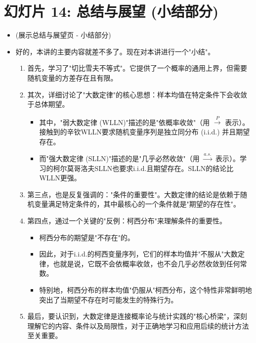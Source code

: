 \documentclass[UTF8]{article} %
\begin{document}
\section*{幻灯片 14: 总结与展望 (小结部分)}
\begin{itemize}
    \itemsep1em
    \item (展示总结与展望页 - 小结部分)
    \item 好的，本讲的主要内容就差不多了。现在对本讲进行一个"小结"。
    \begin{enumerate}[label=\arabic*., itemsep=0.5em]
        \item 首先，学习了"切比雪夫不等式"。它提供了一个概率的通用上界，但需要随机变量的方差存在且有限。
        \item 其次，详细讨论了"大数定律"的核心思想：样本均值在特定条件下会收敛于总体期望。
            \begin{itemize}[label=\textbullet, itemsep=0.2em]
                \item 其中，"弱大数定律 (WLLN)"描述的是"依概率收敛"（用 $\xrightarrow{P}$ 表示）。接触到的辛钦WLLN要求随机变量序列是独立同分布 (i.i.d.) 并且期望存在。
                \item 而"强大数定律 (SLLN)"描述的是"几乎必然收敛"（用 $\xrightarrow{a.s.}$ 表示）。学习的柯尔莫哥洛夫SLLN也要求i.i.d.且期望存在。SLLN的结论比WLLN更强。
            \end{itemize}
        \item 第三点，也是反复强调的："条件的重要性"。大数定律的结论是依赖于随机变量满足特定条件的，其中最核心的一个条件就是"期望的存在性"。
        \item 第四点，通过一个关键的"反例：柯西分布"来理解条件的重要性。
            \begin{itemize}[label=\textbullet, itemsep=0.2em]
                \item 柯西分布的期望是"不存在"的。
                \item 因此，对于i.i.d.的柯西变量序列，它们的样本均值并"不服从"大数定律，也就是说，它既不会依概率收敛，也不会几乎必然收敛到任何常数。
                \item 特别地，柯西分布的样本均值"仍服从"柯西分布，这个特性非常鲜明地突出了当期望不存在时可能发生的特殊行为。
            \end{itemize}
        \item 最后，要认识到，大数定律是连接概率论与统计实践的"核心桥梁"，深刻理解它的内容、条件以及局限性，对于正确地学习和应用后续的统计方法至关重要。
    \end{enumerate}
\end{itemize}
\end{document}
